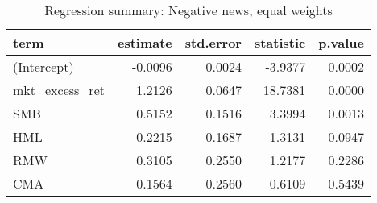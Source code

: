 \begin{table}[H]
\caption{Regression summary: Negative news, equal weights}
\centering
\begin{tabular}{lrrrr}
  \hline
term & estimate & std.error & statistic & p.value \\ 
  \hline
(Intercept) & -0.0096 & 0.0024 & -3.9377 & 0.0002 \\ 
  mkt\_excess\_ret & 1.2126 & 0.0647 & 18.7381 & 0.0000 \\ 
  SMB & 0.5152 & 0.1516 & 3.3994 & 0.0013 \\ 
  HML & 0.2215 & 0.1687 & 1.3131 & 0.0947 \\ 
  RMW & 0.3105 & 0.2550 & 1.2177 & 0.2286 \\ 
  CMA & 0.1564 & 0.2560 & 0.6109 & 0.5439 \\ 
   \hline
\end{tabular}
\label{tab: summary_neg_EW}
\end{table}

